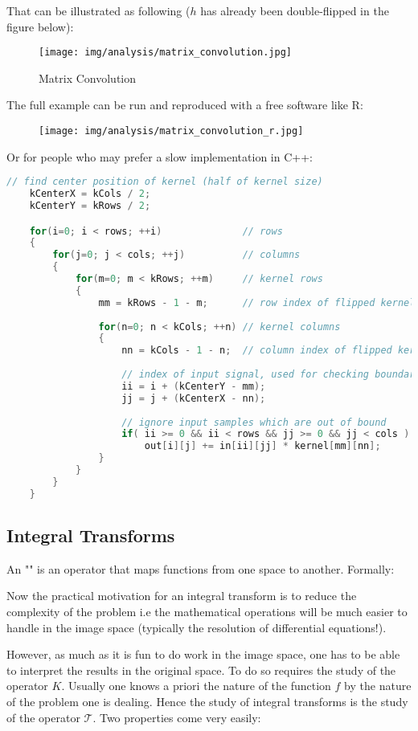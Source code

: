 	That can be illustrated as following ($h$ has already been double-flipped in the figure below):
	\begin{figure}[H]
		\centering
		\texttt{[image: img/analysis/matrix\_convolution.jpg]}
		\caption{Matrix Convolution}
	\end{figure}
	The full example can be run and reproduced with a free software like R:
	\begin{figure}[H]
		\centering
		\texttt{[image: img/analysis/matrix\_convolution\_r.jpg]}
	\end{figure}
	Or for people who may prefer a slow implementation in C++:
	\begin{lstlisting}[language={C++}, caption={C++ for matrix convolution}]
	// find center position of kernel (half of kernel size)
	kCenterX = kCols / 2;
	kCenterY = kRows / 2;

	for(i=0; i < rows; ++i)              // rows
	{
	    for(j=0; j < cols; ++j)          // columns
	    {
	        for(m=0; m < kRows; ++m)     // kernel rows
	        {
	            mm = kRows - 1 - m;      // row index of flipped kernel
	
	            for(n=0; n < kCols; ++n) // kernel columns
	            {
	                nn = kCols - 1 - n;  // column index of flipped kernel
	
	                // index of input signal, used for checking boundary
	                ii = i + (kCenterY - mm);
	                jj = j + (kCenterX - nn);
	
	                // ignore input samples which are out of bound
	                if( ii >= 0 && ii < rows && jj >= 0 && jj < cols )
	                    out[i][j] += in[ii][jj] * kernel[mm][nn];
	            }
	        }
	    }
	}
	\end{lstlisting}

	\pagebreak
	\subsection{Integral Transforms}
	An "" is an operator that maps functions from one space to another. Formally:
	
	Now the practical motivation for an integral transform is to reduce the complexity of the problem i.e the mathematical operations will be much easier to handle in the image space (typically the resolution of differential equations!).
	
	However, as much as it is fun to do work in the image space, one has to be able to interpret the results in the original space. To do so requires the study of the operator $K$. Usually one knows a priori the nature of the function $f$ by the nature of the problem one is dealing. Hence the study of integral transforms is the study of the operator $\mathcal{T}$. Two properties come very easily:
	
